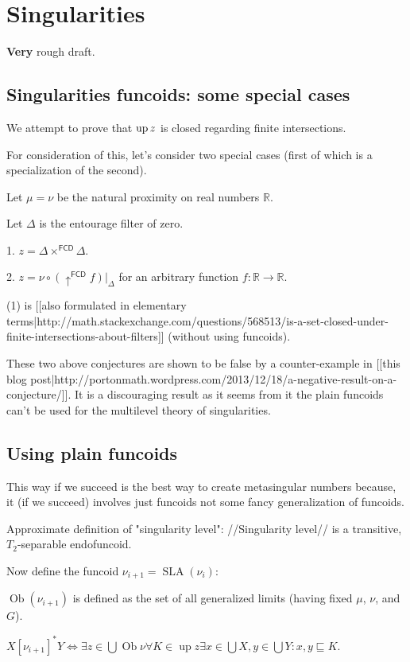 \chapter{Singularities}

\textbf{Very} rough draft.

\section{Singularities funcoids: some special cases}
We attempt to prove that $\operatorname{up} z$ is closed regarding finite intersections.

For consideration of this, let's consider two special cases (first of which is a specialization of the second).

Let $\mu=\nu$ be the natural proximity on real numbers $\mathbb{R}$.

Let $\Delta$ is the entourage filter of zero.

1. $z=\Delta\times^{\mathsf{FCD}}\Delta$.

2. $z=\nu\circ (\uparrow^{\mathsf{FCD}} f)|_{\Delta}$ for an arbitrary function $f:\mathbb{R}\rightarrow\mathbb{R}$.

(1) is [[also formulated in elementary terms|http://math.stackexchange.com/questions/568513/is-a-set-closed-under-finite-intersections-about-filters]] (without using funcoids).

These two above conjectures are shown to be false by a counter-example in [[this blog post|http://portonmath.wordpress.com/2013/12/18/a-negative-result-on-a-conjecture/]]. It is a discouraging result as it seems from it the plain funcoids can't be used for the multilevel theory of singularities.

\section{Using plain funcoids}
This way if we succeed is the best way to create metasingular numbers because, it (if we succeed) involves just funcoids not some fancy generalization of funcoids.

Approximate definition of "singularity level": //Singularity level// is a transitive, $T_2$-separable endofuncoid.

Now define the funcoid $\nu_{i+1}=\operatorname{SLA}(\nu_i)$:

$\operatorname{Ob}(\nu_{i+1})$ is defined as the set of all generalized limits (having fixed $\mu$, $\nu$, and $G$).

$X \mathrel{[ \nu_{i+1}]^{\ast}} Y \Leftrightarrow \exists z \in \bigcup \operatorname{Ob} \nu \forall K \in \operatorname{up} z \exists x \in \bigcup X, y \in \bigcup Y : x, y\sqsubseteq K$.

